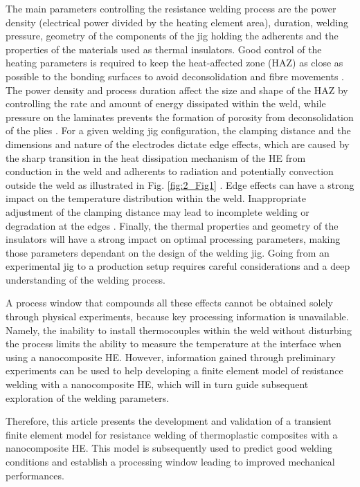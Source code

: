 The main parameters controlling the resistance welding process are the power density (electrical power divided by the heating element area), duration, welding pressure, geometry of the components of the jig holding the adherents and the properties of the materials used as thermal insulators. 
Good control of the heating parameters is required to keep the heat-affected zone (HAZ) as close as possible to the bonding surfaces to avoid deconsolidation and fibre movements \cite{Stavrov2005a}. 
The power density and process duration affect the size and shape of the HAZ by controlling the rate and amount of energy dissipated within the weld, while pressure on the laminates prevents the formation of porosity from deconsolidation of the plies \cite{Shi2017}. 
For a given welding jig configuration, the clamping distance and the dimensions and nature of the electrodes dictate edge effects, which are caused by the sharp transition in the heat dissipation mechanism of the HE from conduction in the weld and adherents to radiation and potentially convection outside the weld as illustrated in Fig. \ref{fig:2_Fig1} \cite{Ageorges2001b}. 
Edge effects can have a strong impact on the temperature distribution within the weld. 
Inappropriate adjustment of the clamping distance may lead to incomplete welding or degradation at the edges \cite{Talbot2013}. 
Finally, the thermal properties and geometry of the insulators will have a strong impact on optimal processing parameters, making those parameters dependant on the design of the welding jig. 
Going from an experimental jig to a production setup requires careful considerations and a deep understanding of the welding process. 

A process window that compounds all these effects cannot be obtained solely through physical experiments, because key processing information is unavailable. 
Namely, the inability to install thermocouples within the weld without disturbing the process limits the ability to measure the temperature at the interface when using a nanocomposite HE. 
However, information gained through preliminary experiments can be used to help developing a finite element model of resistance welding with a nanocomposite HE, which will in turn guide subsequent exploration of the welding parameters. 

Therefore, this article presents the development and validation of a transient finite element model for resistance welding of thermoplastic composites with a nanocomposite HE. 
This model is subsequently used to predict good welding conditions and establish a processing window leading to improved mechanical performances. 

